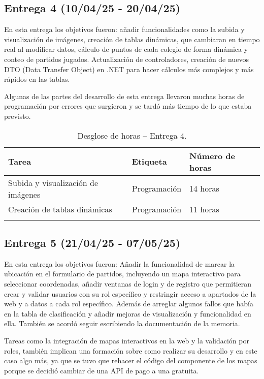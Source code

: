 \subsection{Entrega 4 (10/04/25 - 20/04/25)}

En esta entrega los objetivos fueron: añadir funcionalidades como la subida y visualización de imágenes, creación de tablas dinámicas, que cambiaran en tiempo real al modificar datos, cálculo de puntos de cada colegio de forma dinámica y conteo de partidos jugados. Actualización de controladores, creación de nuevos DTO (Data Transfer Object) en .NET para hacer cálculos más complejos y más rápidos en las tablas. 

Algunas de las partes del desarrollo de esta entrega llevaron muchas horas de programación por errores que surgieron y se tardó más tiempo de lo que estaba previsto.

\begin{longtable}{@{}lll@{}}
  \toprule
  \rowcolor{gray!20}
  Tarea & Etiqueta & Número de horas \\ 
  \midrule
  \endhead
  Subida y visualización de imágenes  & Programación  & 14 horas \\ 
  \midrule

  Creación de tablas dinámicas  &  Programación  &  11 horas \\ 
  \midrule

  \bottomrule
  \caption{Desglose de horas -- Entrega 4.}
\end{longtable}

\subsection{Entrega 5 (21/04/25 - 07/05/25)}

En esta entrega los objetivos fueron: Añadir la funcionalidad de marcar la ubicación en el formulario de partidos, incluyendo un mapa interactivo para seleccionar coordenadas, añadir ventanas de login y de registro que permitieran crear y validar usuarios con su rol específico y restringir acceso a apartados de la web y a datos a cada rol específico. Además de arreglar algunos fallos que había en la tabla de clasificación y añadir mejoras de visualización y funcionalidad en ella. También se acordó seguir escribiendo la documentación de la memoria.

Tareas como la integración de mapas interactivos en la web y la validación por roles, también implican una formación sobre como realizar su desarrollo y en este caso algo más, ya que se tuvo que rehacer el código del componente de los mapas porque se decidió cambiar de una API de pago a una gratuita.

